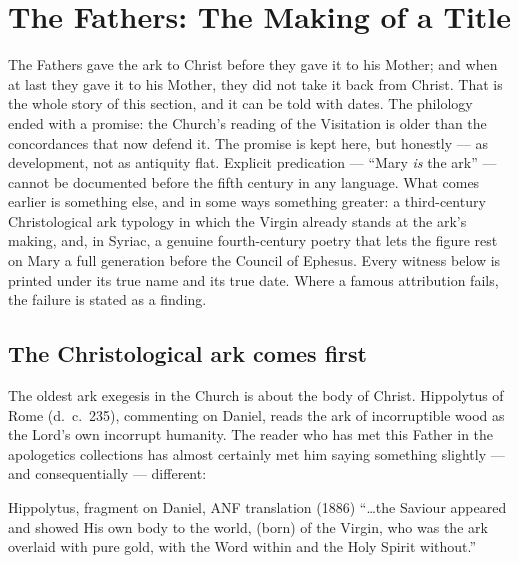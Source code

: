 \sectionguard
\section{The Fathers: The Making of a Title}

The Fathers gave the ark to Christ before they gave it to his Mother;
and when at last they gave it to his Mother, they did not take it back
from Christ. That is the whole story of this section, and it can be
told with dates. The philology ended with a promise: the Church's
reading of the Visitation is older than the concordances that now
defend it. The promise is kept here, but honestly --- as development,
not as antiquity flat. Explicit predication ---
``Mary \emph{is} the ark'' --- cannot be documented before the fifth
century in any language. What comes earlier is something else, and in
some ways something greater: a third-century Christological ark
typology in which the Virgin already stands at the ark's making, and,
in Syriac, a genuine fourth-century poetry that lets the figure rest
on Mary a full generation before the Council of Ephesus. Every
witness below is printed under its true name and its true date. Where
a famous attribution fails, the failure is stated as a finding.

\subsection{The Christological ark comes first}

The oldest ark exegesis in the Church is about the body of Christ.
Hippolytus of Rome (d.~c.~235), commenting on Daniel, reads the ark of
incorruptible wood as the Lord's own incorrupt humanity. The reader
who has met this Father in the apologetics collections has almost
certainly met him saying something slightly --- and consequentially ---
different:

\begin{witnessbox}{Hippolytus, fragment on Daniel, ANF translation (1886)}
``\ldots the Saviour appeared and showed His own body to the world,
(born) of the Virgin, who was the ark overlaid with pure gold, with
the Word within and the Holy Spirit without.''
\end{witnessbox}

